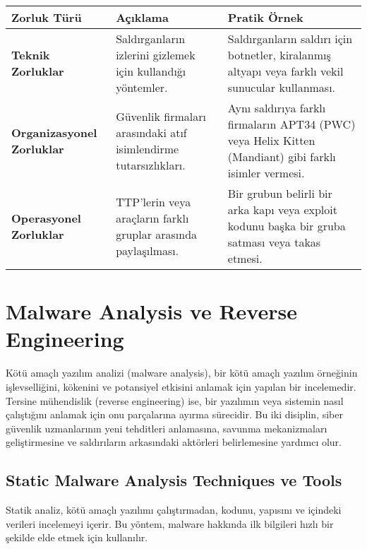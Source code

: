 \begin{tabularx}{\textwidth}{|l|X|X|}
\hline
\textbf{Zorluk Türü} & \textbf{Açıklama} & \textbf{Pratik Örnek} \\
\hline
\textbf{Teknik Zorluklar} & Saldırganların izlerini gizlemek için kullandığı yöntemler. & Saldırganların saldırı için botnetler, kiralanmış altyapı veya farklı vekil sunucular kullanması. \\
\hline
\textbf{Organizasyonel Zorluklar} & Güvenlik firmaları arasındaki atıf isimlendirme tutarsızlıkları. & Aynı saldırıya farklı firmaların APT34 (PWC) veya Helix Kitten (Mandiant) gibi farklı isimler vermesi. \\
\hline
\textbf{Operasyonel Zorluklar} & TTP'lerin veya araçların farklı gruplar arasında paylaşılması. & Bir grubun belirli bir arka kapı veya exploit kodunu başka bir gruba satması veya takas etmesi. \\
\hline
\end{tabularx}

\section{Malware Analysis ve Reverse Engineering}

Kötü amaçlı yazılım analizi (malware analysis), bir kötü amaçlı yazılım örneğinin işlevselliğini, kökenini ve potansiyel etkisini anlamak için yapılan bir incelemedir. Tersine mühendislik (reverse engineering) ise, bir yazılımın veya sistemin nasıl çalıştığını anlamak için onu parçalarına ayırma sürecidir. Bu iki disiplin, siber güvenlik uzmanlarının yeni tehditleri anlamasına, savunma mekanizmaları geliştirmesine ve saldırıların arkasındaki aktörleri belirlemesine yardımcı olur.

\subsection{Static Malware Analysis Techniques ve Tools}

Statik analiz, kötü amaçlı yazılımı çalıştırmadan, kodunu, yapısını ve içindeki verileri incelemeyi içerir. Bu yöntem, malware hakkında ilk bilgileri hızlı bir şekilde elde etmek için kullanılır.

